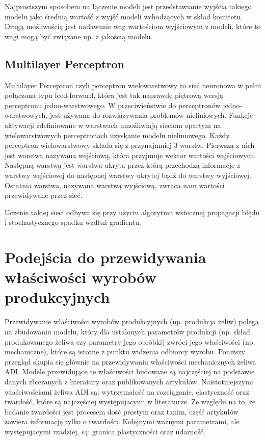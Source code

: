 Najprostszym sposobem na łączenie modeli jest przedstawianie wyjścia takiego modelu jako średnią wartość z wyjść modeli wchodzących w skład komitetu. Drugą możliwością jest nadawanie wag wartościom wyjściowym z modeli, które to wagi mogą być związane np. z jakością modelu.

\subsection{Multilayer Perceptron}
Multilayer Perceptron \cite{negnevitsky2005artificial} czyli perceptron wielowarstwowy to sieć neuronowa w pełni połączona typu feed-forward, która jest tak naprawdę piętrową wersją perceptronu jedno-warstwowego. W przeciwieństwie do perceptronów jedno-warstwowych, jest używana do rozwiązywania problemów nieliniowych. Funkcje aktywacji zdefiniowane w warstwach umożliwiają sieciom opartym na wielowarstwowych perceptronach uzyskanie modelu nieliniowego. Każdy perceptron wielowarstwowy składa się z przynajmniej 3 warstw. Pierwszą z nich jest warstwa nazywana wejściową, która przyjmuje wektor wartości wejściowych. Następną warstwą jest warstwa ukryta przez którą przechodzą informacje z warstwy wejściowej do następnej warstwy ukrytej bądź do warstwy wyjściowej. Ostatnia warstwa, nazywana warstwą wyjściową, zwraca nam wartości przewidywane przez sieć.

Uczenie takiej sieci odbywa się przy użyciu algorytmu wstecznej propagacji błędu i stochastycznego spadku wzdłuż gradientu.

\section{Podejścia do przewidywania właściwości wyrobów produkcyjnych}
Przewidywanie właściwości wyrobów produkcyjnych (np. produkcja żeliw) polega na zbudowaniu modelu, który dla ustalonych parametrów produkcji (np. skład produkowanego żeliwa czy parametry jego obróbki) zwróci jego właściwości (np. mechaniczne), które są istotne z punktu widzenia odbiorcy wyrobu. Poniższy przegląd skupia się głównie na przewidywaniu właściwości mechanicznych żeliwa ADI. Modele przewidujące te właściwości budowane są najczęściej na podstawie danych zbieranych z literatury oraz publikowanych artykułów. Naistotniejszymi właściwościami żeliwa ADI są: wytrzymałość na rozciąganie, elastyczność oraz twardość, które są najczęściej występujacymi w literaturze. Ze względu na to, że badanie twardości jest procesem dość prostym oraz tanim, część artykułów zawiera informację tylko o twardości. Kolejnymi ważnymi parametrami, ale występujacymi rzadziej, są: granica plastyczności oraz udarność. 


